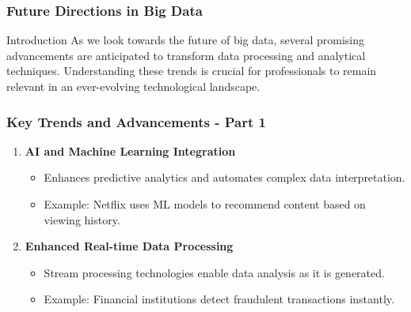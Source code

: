 \documentclass[aspectratio=169]{beamer}
\begin{document}
\begin{frame}[fragile]
    \frametitle{Future Directions in Big Data}
    \begin{block}{Introduction}
        As we look towards the future of big data, several promising advancements are anticipated to transform data processing and analytical techniques. Understanding these trends is crucial for professionals to remain relevant in an ever-evolving technological landscape.
    \end{block}
\end{frame}

\begin{frame}[fragile]
    \frametitle{Key Trends and Advancements - Part 1}
    \begin{enumerate}
        \item \textbf{AI and Machine Learning Integration}
            \begin{itemize}
                \item Enhances predictive analytics and automates complex data interpretation.
                \item Example: Netflix uses ML models to recommend content based on viewing history.
            \end{itemize}
        
        \item \textbf{Enhanced Real-time Data Processing}
            \begin{itemize}
                \item Stream processing technologies enable data analysis as it is generated.
                \item Example: Financial institutions detect fraudulent transactions instantly.
            \end{itemize}
    \end{enumerate}
\end{frame}
\end{document}
